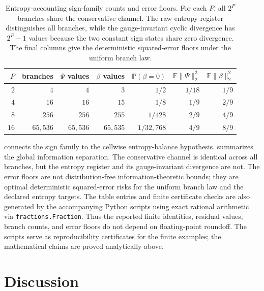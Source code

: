 \documentclass[a4paper,fleqn, sort&compress]{cas-sc}
\theoremstyle{remark}
\theoremstyle{definition}
\begin{document}
\begin{table}[htbp]
\centering
\small
\caption{Entropy-accounting sign-family counts and error floors.  For each
\(P\), all \(2^P\) branches share the conservative channel.  The raw entropy
register distinguishes all branches, while the gauge-invariant cyclic
divergence has \(2^P-1\) values because the two constant sign states share
zero divergence.  The final columns give the deterministic squared-error
floors under the uniform branch law.}
\label{tab:entropy-counts}
\begin{tabular}{@{}rrrrrrr@{}}
\toprule
\(P\) & branches & \(\Psi\) values & \(\beta\) values
& \(\mathbb P(\beta=0)\)
& \(\mathbb E\|\Psi\|_2^2\)
& \(\mathbb E\|\beta\|_2^2\) \\
\midrule
\(2\)  & \(4\)      & \(4\)      & \(3\)      & \(1/2\)       & \(1/18\) & \(1/9\) \\
\(4\)  & \(16\)     & \(16\)     & \(15\)     & \(1/8\)       & \(1/9\)  & \(2/9\) \\
\(8\)  & \(256\)    & \(256\)    & \(255\)    & \(1/128\)     & \(2/9\)  & \(4/9\) \\
\(16\) & \(65{,}536\) & \(65{,}536\) & \(65{,}535\) & \(1/32{,}768\) & \(4/9\)  & \(8/9\) \\
\bottomrule
\end{tabular}
\end{table}

 connects the sign family to the cellwise
entropy-balance hypothesis.   summarizes the global
information separation.  The conservative channel is identical across all
branches, but the entropy register and its gauge-invariant divergence are
not.  The error floors are not distribution-free information-theoretic
bounds; they are optimal deterministic squared-error risks for the uniform
branch law and the declared entropy targets. The table entries and finite certificate checks are also generated by the
accompanying Python scripts using exact rational arithmetic via
\texttt{fractions.Fraction}.  Thus the reported finite identities, residual
values, branch counts, and error floors do not depend on floating-point
roundoff.  The scripts serve as reproducibility certificates for the finite
examples; the mathematical claims are proved analytically above.

\section{Discussion}
\label{sec:discussion}
\end{document}

